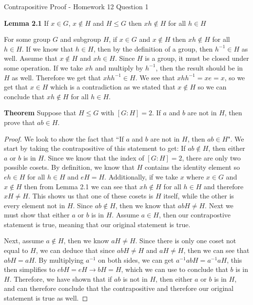 Contrapositive Proof - Homework 12 Question 1

\textbf{Lemma 2.1} If $x \in G$, $x \not \in H$ and $H\leq G$ then $xh \not \in H$ for all $h \in H$

For some group $G$ and subgroup $H$, if $x \in G$ and $x \not \in H$ then $xh \not \in H$ for all $h \in H$.
If we know that $h\in H$, then by the definition of a group, then $h^{-1} \in H$ as well. Assume that $x \not \in H$ and $xh \in H$. Since $H$ is a group, it must be closed under some operation. If we take $xh$ and multiply by $h^{-1}$, then the result should be in $H$ as well. Therefore we get that $xhh^{-1} \in H$. We see that $xhh^{-1} = xe = x$, so we get that $x\in H$ which is a contradiction as we stated that $x \not \in H$ so we can conclude that $xh \not \in H$ for all $h \in H$.



\textbf{Theorem}
Suppose that $H\leq G$ with $[G:H]=2$.  If $a$ and $b$ are not in $H$, then prove that $ab\in H$.



\begin{proof}
We look to show the fact that ``If $a$ and $b$ are not in $H$, then $ab\in H$". We start by taking the contrapositive of this statement to get: If $ab \not\in H$, then either $a$ or $b$ is in $H$. Since we know that the index of $[G:H] = 2$, there are only two possible cosets. By definition, we know that $H$ contains the identity element so $eh \in H$ for all $h\in H$ and $eH = H$. Additionally, if we take $x$ where $x\in G$ and $x \not\in H$ then from Lemma 2.1 we can see that $xh \not \in H $  for all $h\in H$ and therefore $xH \neq H$. This shows us that one of these cosets is $H$ itself, while the other is every element not in $H$. Since $ab\not\in H$, then we know that $abH \neq H$. Next we must show that either $a$ or $b$ is in $H$. Assume $a \in H$, then our contrapostive statement is true, meaning that our original statement is true. 

Next, assume $a \not\in H$, then we know $aH \neq H$.  Since there is only one coset not equal to $H$, we can deduce that since $abH \neq H$ and $aH \neq H$, then we can see that $abH = aH$. By multiplying $a^{-1}$ on both sides, we can get $a^{-1}abH = a^{-1}aH$, this then simplifies to $ebH = eH \rightarrow bH = H$, which we can use to conclude that $b$ is in $H$. Therefore, we have shown that if $ab$ is not in $H$, then either $a$ or $b$ is in $H$, and can therefore conclude that the contrapositive and therefore our original statement is true as well.
\end{proof}
